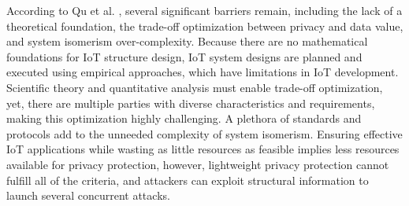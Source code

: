 \documentclass[conference]{IEEEtran}
\begin{document}

According to Qu et al. \cite{Qu2018Privacy}, several significant barriers
remain, including the lack of a theoretical foundation, the trade-off optimization
between privacy and data value, and system isomerism over-complexity. Because
there are no mathematical foundations for IoT structure design, IoT system
designs are planned and executed using empirical approaches, which have limitations
in IoT development. Scientific theory and quantitative analysis must enable
trade-off optimization, yet, there are multiple parties with diverse characteristics
and requirements, making this optimization highly challenging. A plethora
of standards and protocols add to the unneeded complexity of system isomerism.
Ensuring effective IoT applications while wasting as little resources as feasible
implies less resources available for privacy protection, however, lightweight
privacy protection cannot fulfill all of the criteria, and attackers can
exploit structural information to launch several concurrent attacks.
\end{document}
